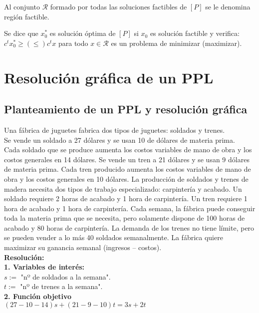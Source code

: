 \documentclass[11pt,fleqn]{book} %
\begin{document}
\begin{definition}
	Al conjunto $\mathcal{R}$ formado por todas las soluciones factibles de $[P]$ se le denomina región factible.
\end{definition}
\begin{definition}
	Se dice que $x_0^*$ es solución óptima de $[P]$ si $x_0$ es solución factible y verifica: \\
	$c^t x_0^* \geq (\leq) c^t x$ para todo $x \in \mathcal{R}$ es un problema de minimizar (maximizar).
\end{definition}
\section{Resolución gráfica de un PPL}
\subsection*{Planteamiento de un PPL y resolución gráfica}
Una fábrica de juguetes fabrica dos tipos de juguetes: soldados y trenes. \\
Se vende un soldado a 27 dólares y se usan 10 de dólares de materia prima. \\
Cada soldado que se produce aumenta los costos variables de mano de obra y los costos generales  en  14  dólares.  Se  vende  un  tren  a  21  dólares  y  se  usan  9  dólares  de materia prima. Cada  tren producido aumenta los costos variables de mano de obra y los costos generales en 10 dólares. La producción de soldados y trenes de madera necesita  dos  tipos  de  trabajo  especializado:  carpintería  y  acabado.  Un  soldado requiere  2  horas  de  acabado  y  1  hora  de  carpintería.  Un  tren  requiere  1  hora  de acabado  y  1  hora  de carpintería.  Cada  semana,  la  fábrica puede  conseguir  toda la materia prima que se necesita, pero solamente dispone de 100 horas de acabado y 80 horas de carpintería. La demanda de los trenes no tiene límite, pero se pueden vender  a  lo  más  40  soldados  semanalmente.  La  fábrica  quiere  maximizar  su ganancia semanal (ingresos – costos). \\
\textbf{Resolución: } \\
\textbf{1. Variables de interés: } \\
$s:=$ "nº de soldados a la semana". \\
$t:=$ "nº de trenes a la semana". \\
\textbf{2. Función objetivo} \\
$(27-10-14)s+(21-9-10)t=3s+2t$ \\
\end{document}
